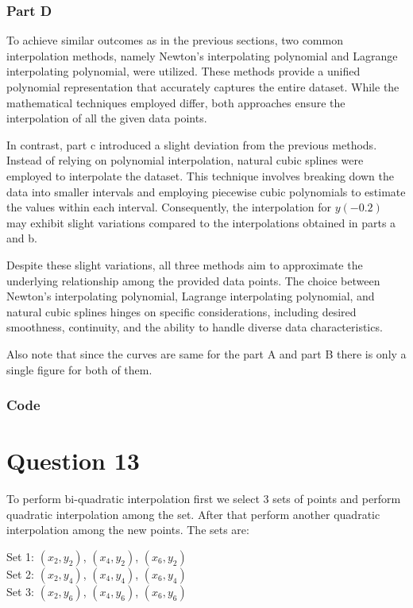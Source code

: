 \documentclass[12pt, a4paper]{article}
\numberwithin{equation}{section}
\begin{document}
\subsubsection{Part D}
To achieve similar outcomes as in the previous sections, two common interpolation methods, namely Newton's interpolating polynomial and Lagrange interpolating polynomial, were utilized. These methods provide a unified polynomial representation that accurately captures the entire dataset. While the mathematical techniques employed differ, both approaches ensure the interpolation of all the given data points.

In contrast, part c introduced a slight deviation from the previous methods. Instead of relying on polynomial interpolation, natural cubic splines were employed to interpolate the dataset. This technique involves breaking down the data into smaller intervals and employing piecewise cubic polynomials to estimate the values within each interval. Consequently, the interpolation for $y(-0.2)$ may exhibit slight variations compared to the interpolations obtained in parts a and b.

Despite these slight variations, all three methods aim to approximate the underlying relationship among the provided data points. The choice between Newton's interpolating polynomial, Lagrange interpolating polynomial, and natural cubic splines hinges on specific considerations, including desired smoothness, continuity, and the ability to handle diverse data characteristics.

Also note that since the curves are same for the part A and part B there is only a single figure for both of them.

\subsubsection{Code}


\section{Question 13}
To perform bi-quadratic interpolation first we select 3 sets of points and perform quadratic interpolation among the set. After that perform another quadratic interpolation among the new points. 
The sets are:
\begin{center}
Set 1: $(x_2, y_2)$, $(x_4, y_2)$, $(x_6, y_2)$\\
Set 2: $(x_2, y_4)$, $(x_4, y_4)$, $(x_6, y_4)$\\
Set 3: $(x_2, y_6)$, $(x_4, y_6)$, $(x_6, y_6)$\\    
\end{center}
\end{document}
